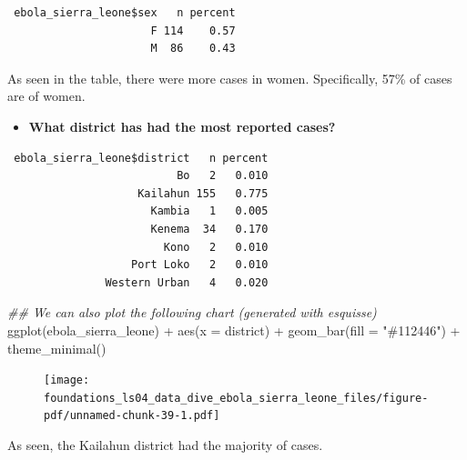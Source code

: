\documentclass[
  letterpaper,
  DIV=11,
  numbers=noendperiod]{scrreprt}
\newenvironment{Shaded}{\begin{snugshade}}{\end{snugshade}}
\newcommand{\AttributeTok}[1]{\textcolor[rgb]{0.40,0.45,0.13}{#1}}
\newcommand{\DocumentationTok}[1]{\textcolor[rgb]{0.37,0.37,0.37}{\textit{#1}}}
\newcommand{\FunctionTok}[1]{\textcolor[rgb]{0.28,0.35,0.67}{#1}}
\newcommand{\NormalTok}[1]{\textcolor[rgb]{0.00,0.23,0.31}{#1}}
\newcommand{\SpecialCharTok}[1]{\textcolor[rgb]{0.37,0.37,0.37}{#1}}
\newcommand{\StringTok}[1]{\textcolor[rgb]{0.13,0.47,0.30}{#1}}
\providecommand{\tightlist}{%
  \setlength{\itemsep}{0pt}\setlength{\parskip}{0pt}}\usepackage{longtable,booktabs,array}
\begin{document}
\begin{verbatim}
 ebola_sierra_leone$sex   n percent
                      F 114    0.57
                      M  86    0.43
\end{verbatim}

As seen in the table, there were more cases in women. Specifically, 57\%
of cases are of women.

\begin{itemize}
\tightlist
\item
  \textbf{What district has had the most reported cases?}
\end{itemize}

\begin{Shaded}
\end{Shaded}

\begin{verbatim}
 ebola_sierra_leone$district   n percent
                          Bo   2   0.010
                    Kailahun 155   0.775
                      Kambia   1   0.005
                      Kenema  34   0.170
                        Kono   2   0.010
                   Port Loko   2   0.010
               Western Urban   4   0.020
\end{verbatim}

\begin{Shaded}
\begin{Highlighting}[]
\DocumentationTok{\#\# We can also plot the following chart (generated with esquisse)}
\FunctionTok{ggplot}\NormalTok{(ebola\_sierra\_leone) }\SpecialCharTok{+}
  \FunctionTok{aes}\NormalTok{(}\AttributeTok{x =}\NormalTok{ district) }\SpecialCharTok{+}
  \FunctionTok{geom\_bar}\NormalTok{(}\AttributeTok{fill =} \StringTok{"\#112446"}\NormalTok{) }\SpecialCharTok{+}
  \FunctionTok{theme\_minimal}\NormalTok{()}
\end{Highlighting}
\end{Shaded}

\begin{figure}[H]

{\centering \texttt{[image: foundations\_ls04\_data\_dive\_ebola\_sierra\_leone\_files/figure-pdf/unnamed-chunk-39-1.pdf]}

}

\end{figure}

As seen, the Kailahun district had the majority of cases.
\end{document}
